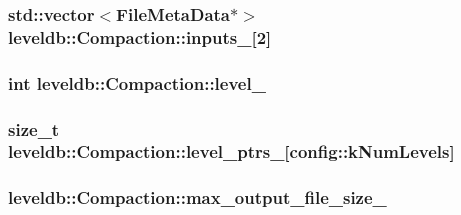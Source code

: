 \hypertarget{classleveldb_1_1_compaction_ae4134d8076b7b3657151e077c394acfc}{
\subsubsection[{inputs\-\_\-}]{\setlength{\rightskip}{0pt plus 5cm}std\-::vector$<${\bf File\-Meta\-Data}$\ast$$>$ leveldb\-::\-Compaction\-::inputs\-\_\-\mbox{[}2\mbox{]}\hspace{0.3cm}{\ttfamily [private]}}}\label{classleveldb_1_1_compaction_ae4134d8076b7b3657151e077c394acfc}
\hypertarget{classleveldb_1_1_compaction_a773153291660bb827362f2290dcc54c1}{
\subsubsection[{level\-\_\-}]{\setlength{\rightskip}{0pt plus 5cm}int leveldb\-::\-Compaction\-::level\-\_\-\hspace{0.3cm}{\ttfamily [private]}}}\label{classleveldb_1_1_compaction_a773153291660bb827362f2290dcc54c1}
\hypertarget{classleveldb_1_1_compaction_a64265c8ae55ac34be8e81d9cb1ea22b5}{
\subsubsection[{level\-\_\-ptrs\-\_\-}]{\setlength{\rightskip}{0pt plus 5cm}size\-\_\-t leveldb\-::\-Compaction\-::level\-\_\-ptrs\-\_\-\mbox{[}{\bf config\-::k\-Num\-Levels}\mbox{]}\hspace{0.3cm}{\ttfamily [private]}}}\label{classleveldb_1_1_compaction_a64265c8ae55ac34be8e81d9cb1ea22b5}
\hypertarget{classleveldb_1_1_compaction_a15c8ad7b57cd233f1c712ad12aa65163}{
\subsubsection[{max\-\_\-output\-\_\-file\-\_\-size\-\_\-}]{ leveldb\-::\-Compaction\-::max\-\_\-output\-\_\-file\-\_\-size\-\_\-\hspace{0.3cm}{\ttfamily [private]}}}\label{classleveldb_1_1_compaction_a15c8ad7b57cd233f1c712ad12aa65163}
